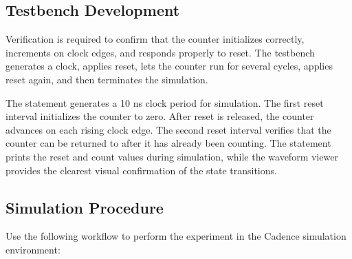 \subsection{Testbench Development}
Verification is required to confirm that the counter initializes correctly, increments on clock
edges, and responds properly to reset. The testbench generates a clock, applies reset, lets the
counter run for several cycles, applies reset again, and then terminates the simulation.


\noindent The  statement generates a 10 ns clock period for simulation. The
first reset interval initializes the counter to zero. After reset is released, the counter advances
on each rising clock edge. The second reset interval verifies that the counter can be returned to
 after it has already been counting. The  statement prints the
reset and count values during simulation, while the waveform viewer provides the clearest visual
confirmation of the state transitions.

\subsection{Simulation Procedure}
Use the following workflow to perform the experiment in the Cadence simulation environment:

